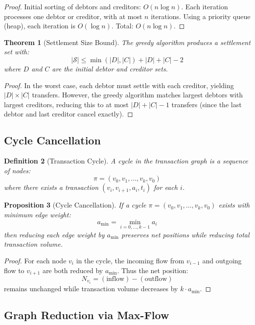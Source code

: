 \documentclass[12pt]{article}
\newtheorem{theorem}{Theorem}
\newtheorem{definition}[theorem]{Definition}
\newtheorem{proposition}[theorem]{Proposition}
\begin{document}
\begin{proof}
Initial sorting of debtors and creditors: $O(n \log n)$. Each iteration processes one debtor or creditor, with at most $n$ iterations. Using a priority queue (heap), each iteration is $O(\log n)$. Total: $O(n \log n)$.
\end{proof}

\begin{theorem}[Settlement Size Bound]
The greedy algorithm produces a settlement set with:
$$
|\mathcal{S}| \leq \min(|D|, |C|) + |D| + |C| - 2
$$
where $D$ and $C$ are the initial debtor and creditor sets.
\end{theorem}

\begin{proof}
In the worst case, each debtor must settle with each creditor, yielding $|D| \times |C|$ transfers. However, the greedy algorithm matches largest debtors with largest creditors, reducing this to at most $|D| + |C| - 1$ transfers (since the last debtor and last creditor cancel exactly).
\end{proof}

\subsection{Cycle Cancellation}

\begin{definition}[Transaction Cycle]
A cycle in the transaction graph is a sequence of nodes:
$$
\pi = (v_0, v_1, \ldots, v_k, v_0)
$$
where there exists a transaction $(v_i, v_{i+1}, a_i, t_i)$ for each $i$.
\end{definition}

\begin{proposition}[Cycle Cancellation]
If a cycle $\pi = (v_0, v_1, \ldots, v_k, v_0)$ exists with minimum edge weight:
$$
a_{\min} = \min_{i=0,\ldots,k-1} a_i
$$
then reducing each edge weight by $a_{\min}$ preserves net positions while reducing total transaction volume.
\end{proposition}

\begin{proof}
For each node $v_i$ in the cycle, the incoming flow from $v_{i-1}$ and outgoing flow to $v_{i+1}$ are both reduced by $a_{\min}$. Thus the net position:
$$
N_{v_i} = (\text{inflow}) - (\text{outflow})
$$
remains unchanged while transaction volume decreases by $k \cdot a_{\min}$.
\end{proof}

\subsection{Graph Reduction via Max-Flow}
\end{document}
